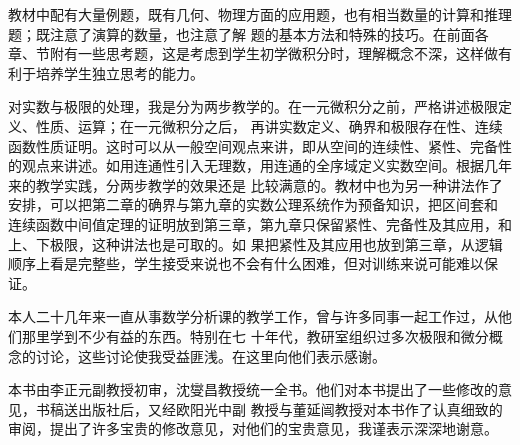 \begin{preface}
教材中配有大量例题，既有几何、物理方面的应用题，也有相当数量的计算和推理题；既注意了演算的数量，也注意了解
题的基本方法和特殊的技巧。在前面各章、节附有一些思考题，这是考虑到学生初学微积分时，理解概念不深，这样做有
利于培养学生独立思考的能力。

对实数与极限的处理，我是分为两步教学的。在一元微积分之前，严格讲述极限定义、性质、运算；在一元微积分之后，%
再讲实数定义、确界和极限存在性、连续函数性质证明。这时可以从一般空间观点来讲，即从空间的连续性、紧性、完备性
的观点来讲述。如用连通性引入无理数，用连通的全序域定义实数空间。根据几年来的教学实践，分两步教学的效果还是
比较满意的。教材中也为另一种讲法作了安排，可以把第二章的确界与第九章的实数公理系统作为预备知识，把区间套和
连续函数中间值定理的证明放到第三章，第九章只保留紧性、完备性及其应用，和上、下极限，这种讲法也是可取的。如
果把紧性及其应用也放到第三章，从逻辑顺序上看是完整些，学生接受来说也不会有什么困难，但对训练来说可能难以保
证。

本人二十几年来一直从事数学分析课的教学工作，曾与许多同事一起工作过，从他们那里学到不少有益的东西。特别在七
十年代，教研室组织过多次极限和微分概念的讨论，这些讨论使我受益匪浅。在这里向他们表示感谢。

本书由李正元副教授初审，沈燮昌教授统一全书。他们对本书提出了一些修改的意见，书稿送出版社后，又经欧阳光中副
教授与董延闿教授对本书作了认真细致的审阅，提出了许多宝贵的修改意见，对他们的宝贵意见，我谨表示深深地谢意。
\end{preface}

\endinput
